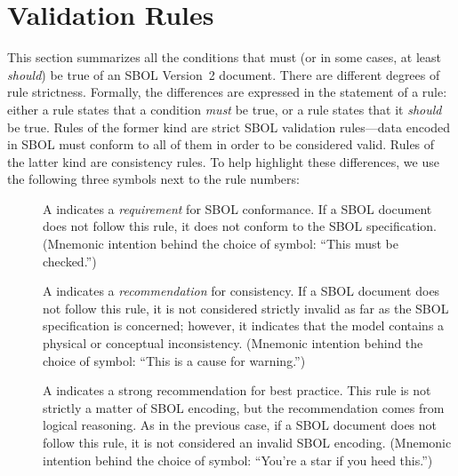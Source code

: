 \newcommand{\printValid}{\validRule{sbol-\arabic{sbolCtr}\addtocounter{sbolCtr}{1}}}
\newcommand{\printModeling}{\modelingRule{sbol-\arabic{sbolCtr}\addtocounter{sbolCtr}{1}}}

\section{Validation Rules}
\label{validation}

This section summarizes all the conditions that must (or in some cases,
at least \emph{should}) be true of an SBOL Version~2 document.  
There are different degrees of rule strictness.  Formally, the differences are expressed in the statement of a rule: either a rule states that a condition \emph{must} be true, or a rule states that it \emph{should} be true.  Rules of the former kind are strict SBOL validation rules---data encoded in SBOL must conform to
all of them in order to be considered valid.  Rules of the latter kind
are consistency rules.  To help highlight these differences, we use the
following three symbols next to the rule numbers:

\begin{description}

\item[\hspace*{6.5pt}\vSymbol\vsp] A \vSymbolName indicates a
  \emph{requirement} for SBOL conformance. If a SBOL document does not follow this rule, it does not conform to the SBOL
  specification.  (Mnemonic intention behind the choice of symbol:
  ``This must be checked.'')

\item[\hspace*{6.5pt}\cSymbol\csp] A \cSymbolName indicates a
  \emph{recommendation} for consistency.  If a SBOL document does not
  follow this rule, it is not considered strictly invalid as far as the
  SBOL specification is concerned; however, it indicates that the model contains a physical or conceptual inconsistency.  (Mnemonic intention behind the choice of symbol:
  ``This is a cause for warning.'')

\item[\hspace*{6.5pt}\mSymbol\msp] A \mSymbolName indicates a strong
  recommendation for best practice.  This rule is not strictly
  a matter of SBOL encoding, but the recommendation comes from logical
  reasoning.  As in the previous case, if a SBOL document does not follow this rule, it is not considered an invalid SBOL encoding.  (Mnemonic intention behind the choice of symbol: ``You're a star if you heed this.'')

\end{description}

